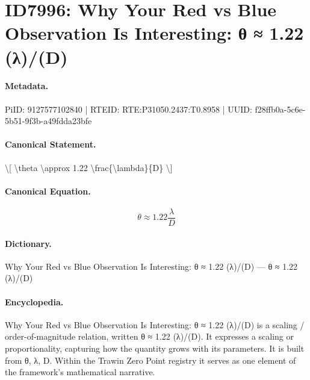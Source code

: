\section*{ID7996: Why Your Red vs Blue Observation Is Interesting: θ ≈ 1.22 (λ)/(D)}
\paragraph{Metadata.}
PiID: 9127577102840 | RTEID: RTE:P31050.2437:T0.8958 | UUID: f28ffb0a-5c6e-5b51-9f3b-a49fdda23bfe

\paragraph{Canonical Statement.}
\textbackslash{}[ \textbackslash{}theta \textbackslash{}approx 1.22 \textbackslash{}frac\{\textbackslash{}lambda\}\{D\} \textbackslash{}]

\paragraph{Canonical Equation.}
\[
\theta \approx 1.22 \frac{\lambda}{D}
\]

\paragraph{Dictionary.}
Why Your Red vs Blue Observation Is Interesting: θ ≈ 1.22 (λ)/(D) — θ ≈ 1.22 (λ)/(D)

\paragraph{Encyclopedia.}
Why Your Red vs Blue Observation Is Interesting: θ ≈ 1.22 (λ)/(D) is a scaling / order-of-magnitude relation, written θ ≈ 1.22 (λ)/(D). It expresses a scaling or proportionality, capturing how the quantity grows with its parameters. It is built from θ, λ, D. Within the Trawin Zero Point registry it serves as one element of the framework's mathematical narrative.
